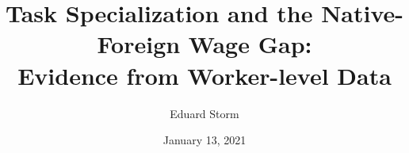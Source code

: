 \documentclass[10pt]{beamer}
\title[Task Specialization \& NF Wage Gap]{Task Specialization and the Native-Foreign Wage Gap: \\ Evidence from Worker-level Data} %
\author{Eduard Storm} %
\institute[estorm@carleton.edu]
{
	
	
	\medskip 
	
	Department of Economics \\  
	Carleton College \\ %
	\textit{estorm@carleton.edu} %
	
	\bigskip
	
	 Job Market Paper Presentation for: \\
		\smallskip
	EBS University of Business and Law
}
\date{January 13, 2021} %
\begin{document}
\begin{frame}
\titlepage %
\end{frame}






 
 
 
 
 
 

\end{document}
